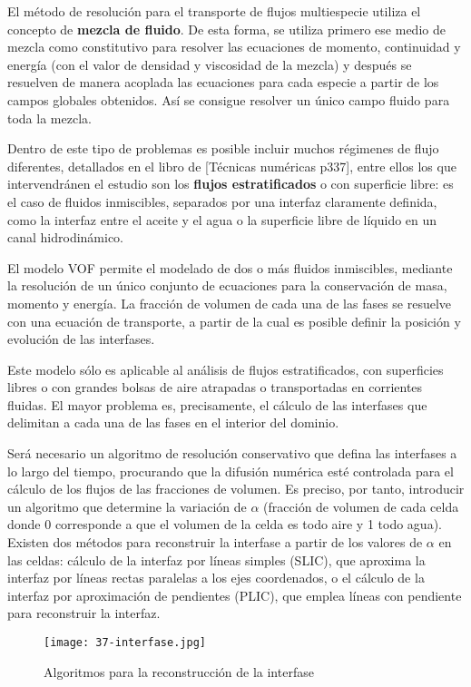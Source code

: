El método de resolución para el transporte de flujos multiespecie
utiliza el concepto de \textbf{mezcla de fluido}. De esta forma, se
utiliza primero ese medio de mezcla como constitutivo para resolver las
ecuaciones de momento, continuidad y energía (con el valor de densidad y
viscosidad de la mezcla) y después se resuelven de manera acoplada las
ecuaciones para cada especie a partir de los campos globales obtenidos.
Así se consigue resolver un único campo fluido para toda la mezcla.

Dentro de este tipo de problemas es posible incluir muchos régimenes de
flujo diferentes, detallados en el libro de {[}Técnicas numéricas
p337{]}, entre ellos los que intervendránen el estudio son los
\textbf{flujos estratificados} o con superficie libre: es el caso de
fluidos inmiscibles, separados por una interfaz claramente definida,
como la interfaz entre el aceite y el agua o la superficie libre de
líquido en un canal hidrodinámico.

El modelo VOF permite el modelado de dos o más fluidos inmiscibles,
mediante la resolución de un único conjunto de ecuaciones para la
conservación de masa, momento y energía. La fracción de volumen de cada
una de las fases se resuelve con una ecuación de transporte, a partir de
la cual es posible definir la posición y evolución de las interfases.

Este modelo sólo es aplicable al análisis de flujos estratificados, con
superficies libres o con grandes bolsas de aire atrapadas o
transportadas en corrientes fluidas. El mayor problema es, precisamente,
el cálculo de las interfases que delimitan a cada una de las fases en el
interior del dominio.

Será necesario un algoritmo de resolución conservativo que defina las
interfases a lo largo del tiempo, procurando que la difusión numérica
esté controlada para el cálculo de los flujos de las fracciones de
volumen. Es preciso, por tanto, introducir un algoritmo que determine la
variación de \(\alpha\) (fracción de volumen de cada celda donde 0
corresponde a que el volumen de la celda es todo aire y 1 todo agua).
Existen dos métodos para reconstruir la interfase a partir de los
valores de \(\alpha\) en las celdas: cálculo de la interfaz por líneas
simples (SLIC), que aproxima la interfaz por líneas rectas paralelas a
los ejes coordenados, o el cálculo de la interfaz por aproximación de
pendientes (PLIC), que emplea líneas con pendiente para reconstruir la
interfaz.

\begin{figure}
\centering
\texttt{[image: 37-interfase.jpg]}
\caption[Algoritmos para la reconstrucción de la interfase]{Algoritmos para la reconstrucción de la interfase \cite{kothe96}}
\label{fig:interfase}
\end{figure}
